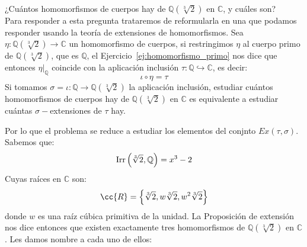 \begin{ejemplo}
    ¿Cuántos homomorfismos de cuerpos hay de $\mathbb{Q}\left(\sqrt[3]{2}\right)$ en $\mathbb{C}$, y cuáles son?\\

    \noindent
    Para responder a esta pregunta trataremos de reformularla en una que podamos responder usando la teoría de extensiones de homomorfismos. Sea $\eta:\mathbb{Q}\left(\sqrt[3]{2}\right)\to\mathbb{C}$ un homomorfismo de cuerpos, si restringimos $\eta$ al cuerpo primo de $\mathbb{Q}\left(\sqrt[3]{2}\right)$, que es $\mathbb{Q}$, el Ejercicio~\ref{ej:homomorfismo_primo} nos dice que entonces $\eta\big|_{\mathbb{Q}}$ coincide con la aplicación inclusión $\tau:\mathbb{Q}\hookrightarrow \mathbb{C}$, es decir:
    \begin{equation*}
        \iota \circ \eta = \tau
    \end{equation*}
    Si tomamos $\sigma=\iota:\mathbb{Q}\to\mathbb{Q}\left(\sqrt[3]{2}\right)$ la aplicación inclusión, estudiar cuántos homomorfismos de cuerpos hay de $\mathbb{Q}\left(\sqrt[3]{2}\right)$ en $\mathbb{C}$ es equivalente a estudiar cuántas $\sigma-$extensiones de $\tau$ hay.
    \begin{figure}[H]
        \centering
    \end{figure}
    \noindent
    Por lo que el problema se reduce a estudiar los elementos del conjnto $Ex(\tau,\sigma)$. Sabemos que:
    \begin{equation*}
        \operatorname{Irr}\left(\sqrt[3]{2},\mathbb{Q}\right) = x^3-2
    \end{equation*}
    Cuyas raíces en $\mathbb{C}$ son:
    \begin{equation*}
        \cc{R} = \left\{\sqrt[3]{2}, w\sqrt[3]{2}, w^2\sqrt[3]{2}\right\}
    \end{equation*}
    donde $w$ es una raíz cúbica primitiva de la unidad. La Proposición de extensión nos dice entonces que existen exactamente tres homomorfismos de $\mathbb{Q}\left(\sqrt[3]{2}\right)$ en $\mathbb{C}$. Les damos nombre a cada uno de ellos:
    \begin{equation*}

\end{equation*}
\end{ejemplo}
